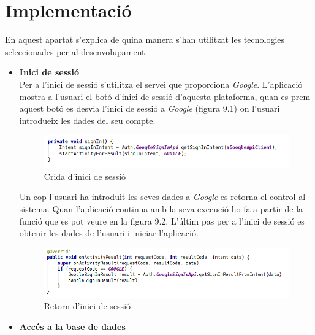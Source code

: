 
\chapter{Implementació} %

\label{Implementacio} %

En aquest apartat s'explica de quina manera s'han utilitzat les tecnologies seleccionades per al desenvolupament.

\begin{itemize}
\item{}\textbf{Inici de sessió}\\

Per a l'inici de sessió s'utilitza el servei que proporciona \textit{Google}. L'aplicació mostra a l'usuari el botó d'inici de sessió d'aquesta plataforma, quan es prem aquest botó es desvia l'inici de sessió a \textit{Google} (figura 9.1) on l'usuari introdueix les dades del seu compte.

\begin{figure}[!h]
\centering
\includegraphics[scale=0.9]{Figures/initSessio1.png}
\caption{Crida d'inici de sessió}
\end{figure}

Un cop l'usuari ha introduit les seves dades a \textit{Google} es retorna el control al sistema. Quan l'aplicació continua amb la seva execució ho fa a partir de la funció que es pot veure en la figura 9.2. L'últim pas per a l'inici de sessió es obtenir les dades de l'usuari i iniciar l'aplicació.

\begin{figure}[!h]
\centering
\includegraphics[scale=0.8]{Figures/initSessio2.png}
\caption{Retorn d'inici de sessió}
\end{figure}

\item{\textbf{Accés a la base de dades}}\\


\end{itemize}
